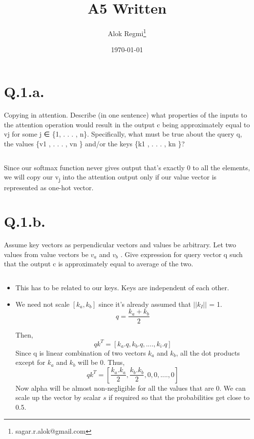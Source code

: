 \documentclass[11pt]{article}
\author{Alok Regmi\thanks{sagar.r.alok@gmail.com}}
\date{\today}
\title{A5 Written}
\begin{document}
\maketitle
\tableofcontents



\section*{Q.1.a.}
\label{sec:orgf864f36}

Copying in attention. Describe (in one sentence) what properties of the inputs to the attention operation would result in
the output c being approximately equal to vj for some j ∈ \{1, . . . , n\}. Specifically, what must be
true about the query q, the values \{v1 , . . . , vn \} and/or the keys \{k1 , . . . , kn \}?

\subsection*{}
\label{sec:org8311e15}

Since our softmax function never gives output that's exactly 0 to all the elements, we will copy our v\textsubscript{j} into the attention output only if our value vector is represented as one-hot vector.
\section*{Q.1.b.}
\label{sec:org4c8d08e}

Assume key vectors as perpendicular vectors and values be arbitrary. Let two values from value vectors be \(v_{a}\) and \(v_{b}\) . Give expression for query vector q such that the output c is approximately equal to average of the two.

\subsection*{}
\label{sec:org3e76666}

\begin{itemize}
\item This has to be related to our keys. Keys are independent of each other.
\item We need not scale \([k_{a}, k_{b}]\) since it's already assumed that \(||k_{I}||\) = 1.
$$ q = \frac{k_{a} + k_{b}}{2}$$

 Then,
 $$ qk^{T} = [k_{a}.q, k_{b}.q, .... , k_{i}.q]$$
Since q is linear combination of two vectors \(k_{a}\) and \(k_{b}\), all the dot products except for \(k_{a}\) and \(k_{b}\) will be 0.
 Thus, $$qk^{T} = [\frac{_{}k_{a}.k_{a}}{2}, \frac{k_{b}.k_{b}}{2}, 0,0,....,0]$$
 Now alpha will be almost non-negligible for all the values that are 0. We can scale up the vector by scalar \(s\) if required so that the probabilities get close to 0.5.
\end{itemize}
\end{document}

